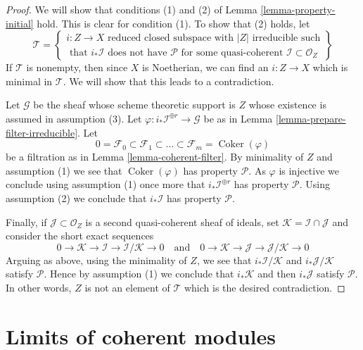 \documentclass{stacks-project}
\theoremstyle{plain}
\theoremstyle{definition}
\theoremstyle{remark}
\numberwithin{equation}{subsection}
\def\Coker{\mathop{\mathrm{Coker}}}
\begin{document}
\begin{proof}
We will show that conditions (1) and (2) of
Lemma \ref{lemma-property-initial} hold. This is clear for condition (1).
To show that (2) holds, let
$$
\mathcal{T} =
\left\{
\begin{matrix}
i : Z \to X \text{ reduced closed subspace with }|Z|\text{ irreducible such}\\
\text{ that }i_*\mathcal{I}\text{ does not have }\mathcal{P}
\text{ for some quasi-coherent }\mathcal{I} \subset \mathcal{O}_Z
\end{matrix}
\right\}
$$
If $\mathcal{T}$ is nonempty, then since $X$ is Noetherian, we can
find an $i : Z \to X$ which is minimal in $\mathcal{T}$. We will show
that this leads to a contradiction.

\medskip\noindent
Let $\mathcal{G}$ be the sheaf whose scheme theoretic support is $Z$ whose
existence is assumed in assumption (3). Let
$\varphi : i_*\mathcal{I}^{\oplus r} \to \mathcal{G}$ be as in
Lemma \ref{lemma-prepare-filter-irreducible}. Let
$$
0 = \mathcal{F}_0 \subset \mathcal{F}_1 \subset
\ldots \subset \mathcal{F}_m = \Coker(\varphi)
$$
be a filtration as in Lemma \ref{lemma-coherent-filter}. By minimality
of $Z$ and assumption (1) we see that $\Coker(\varphi)$ has
property $\mathcal{P}$. As $\varphi$ is injective we conclude using
assumption (1) once more that $i_*\mathcal{I}^{\oplus r}$ has property
$\mathcal{P}$. Using assumption (2) we conclude that $i_*\mathcal{I}$
has property $\mathcal{P}$.

\medskip\noindent
Finally, if $\mathcal{J} \subset \mathcal{O}_Z$ is a second quasi-coherent
sheaf of ideals, set $\mathcal{K} = \mathcal{I} \cap \mathcal{J}$
and consider the short exact sequences
$$
0 \to \mathcal{K} \to \mathcal{I} \to \mathcal{I}/\mathcal{K} \to 0
\quad
\text{and}
\quad
0 \to \mathcal{K} \to \mathcal{J} \to \mathcal{J}/\mathcal{K} \to 0
$$
Arguing as above, using the minimality of $Z$, we see that
$i_*\mathcal{I}/\mathcal{K}$ and $i_*\mathcal{J}/\mathcal{K}$
satisfy $\mathcal{P}$. Hence by assumption (1) we conclude that
$i_*\mathcal{K}$ and then $i_*\mathcal{J}$ satisfy $\mathcal{P}$.
In other words, $Z$ is not an element of $\mathcal{T}$ which is
the desired contradiction.
\end{proof}






\section{Limits of coherent modules}
\label{section-limits}
\end{document}
